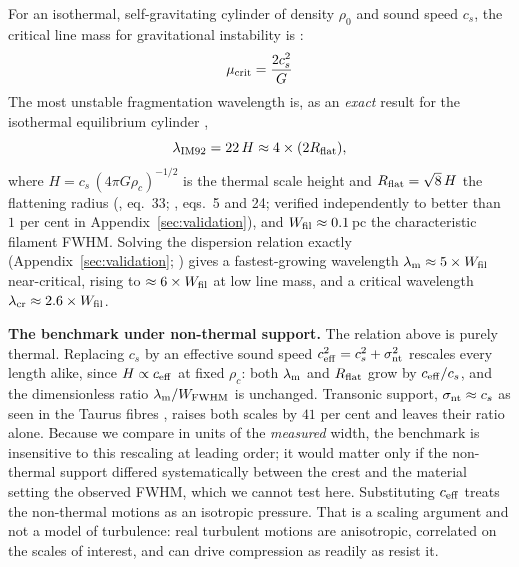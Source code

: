 \documentclass[usenatbib,twoside,twocolumn]{mnras}
\begin{document}
For an isothermal, self-gravitating cylinder of density $\rho_0$ and sound speed $c_s$, the critical line mass for gravitational instability is \citep{Ostriker1964}:
\begin{equation}
\mu_{\rm crit} = \frac{2c_s^2}{G}
\label{eq:mucrit}
\end{equation}
The most unstable fragmentation wavelength is, as an \emph{exact} result for the isothermal equilibrium cylinder \citep{Inutsuka1992},
\begin{equation}
\lambda_{\rm IM92} = 22\,H \approx 4\times(2R_{\rm flat}),
\label{eq:lambdam}
\end{equation}
where $H = c_s\,(4\pi G\rho_c)^{-1/2}$ is the thermal scale height and $R_{\rm flat}=\sqrt8\,H$ the flattening radius (\citealt{Nagasawa1987}, eq.~33; \citealt{Fischera2012}, eqs.~5 and 24; verified independently to better than $1$ per cent in Appendix~\ref{sec:validation}), and $W_{\rm fil}\approx0.1$\,pc the characteristic filament FWHM. Solving the dispersion relation exactly (Appendix~\ref{sec:validation}; \citealt{Fischera2012}) gives a fastest-growing wavelength $\lambda_{\rm m}\approx5\times W_{\rm fil}$ near-critical, rising to $\approx6\times W_{\rm fil}$ at low line mass, and a critical wavelength $\lambda_{\rm cr}\approx2.6\times W_{\rm fil}$. 

\smallskip \smallskip\noindent\textbf{The benchmark under non-thermal support.} The relation above is purely thermal. Replacing $c_s$ by an effective sound speed $c_{\rm eff}^2=c_s^2+\sigma_{\rm nt}^2$ rescales every length alike, since $H\propto c_{\rm eff}$ at fixed $\rho_c$: both $\lambda_{\rm m}$ and $R_{\rm flat}$ grow by $c_{\rm eff}/c_s$, and the dimensionless ratio $\lambda_{\rm m}/W_{\rm FWHM}$ is unchanged. Transonic support, $\sigma_{\rm nt}\approx c_s$ as seen in the Taurus fibres \citep{Hacar2013}, raises both scales by $41$ per cent and leaves their ratio alone. Because we compare in units of the \emph{measured} width, the benchmark is insensitive to this rescaling at leading order; it would matter only if the non-thermal support differed systematically between the crest and the material setting the observed FWHM, which we cannot test here. Substituting $c_{\rm eff}$ treats the non-thermal motions as an isotropic pressure. That is a scaling argument and not a model of turbulence: real turbulent motions are anisotropic, correlated on the scales of interest, and can drive compression as readily as resist it.
\end{document}
